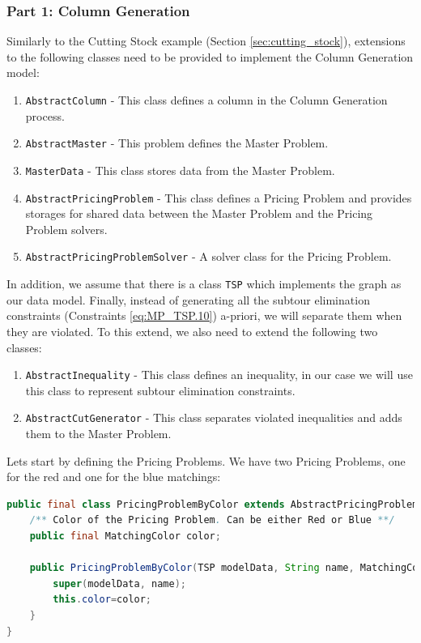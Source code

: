 \documentclass[a4paper]{article}
\newenvironment{myblock}[1]{%
    \tcolorbox[beamer,%
    noparskip,breakable,
    colback=lightBlueCodeBlock,colframe=darkBlueCodeBlock,%
    colbacklower=darkBlueCodeBlock!75!lightBlueCodeBlock,%
    coltitle=blueTitleCodeBlock,
    title=#1]}%
    {\endtcolorbox}
\newcommand{\code}[1]{\lstinline[language=java, style=seminar]!#1!}
\begin{document}
\subsubsection{Part 1: Column Generation}
Similarly to the Cutting Stock example (Section \ref{sec:cutting_stock}), extensions to the following classes need to be provided to implement the Column Generation model:
\begin{enumerate}[nolistsep]
 \item \code{AbstractColumn} - This class defines a column in the Column Generation process.
 \item \code{AbstractMaster} - This problem defines the Master Problem.
 \item \code{MasterData} - This class stores data from the Master Problem.
 \item \code{AbstractPricingProblem} - This class defines a Pricing Problem and provides storages for shared data between the Master Problem and the Pricing Problem solvers.
 \item \code{AbstractPricingProblemSolver} - A solver class for the Pricing Problem.
\end{enumerate}
In addition, we assume that there is a class \code{TSP} which implements the graph as our data model. Finally, instead of generating all the subtour elimination constraints (Constraints \eqref{eq:MP_TSP.10}) a-priori, we will separate them when they are violated. To this extend, we also need to extend the following two classes:
\begin{enumerate}[nolistsep]
 \item \code{AbstractInequality} - This class defines an inequality, in our case we will use this class to represent subtour elimination constraints.
 \item \code{AbstractCutGenerator} - This class separates violated inequalities and adds them to the Master Problem.
\end{enumerate}

Lets start by defining the Pricing Problems. We have two Pricing Problems, one for the red and one for the blue matchings:
\begin{myblock}{PricingProblemByColor}
\begin{lstlisting}[language=java, style=eclipseArticle, xleftmargin=2em]  
public final class PricingProblemByColor extends AbstractPricingProblem<TSP> {	
	/** Color of the Pricing Problem. Can be either Red or Blue **/
	public final MatchingColor color;

	public PricingProblemByColor(TSP modelData, String name, MatchingColor color) {
		super(modelData, name);
		this.color=color;
	}
}
\end{lstlisting}
\end{myblock}
\end{document}
